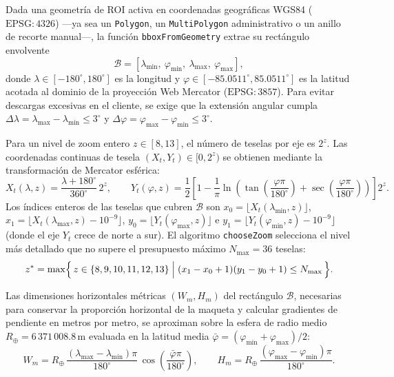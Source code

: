 \documentclass[11pt,a4paper]{article}
\newcommand{\unit}[1]{\mathrm{#1}}
\begin{document}
Dada una geometría de ROI activa en coordenadas geográficas WGS84 ($\mathrm{EPSG}{:}4326$) ---ya sea un
\texttt{Polygon}, un \texttt{MultiPolygon} administrativo o un anillo de recorte manual---, la función
\texttt{bboxFromGeometry} extrae su rectángulo envolvente
\begin{equation}
  \mathcal{B} = [\lambda_{\min},\ \varphi_{\min},\ \lambda_{\max},\ \varphi_{\max}],
  \label{eq:bbox-relieve}
\end{equation}
donde $\lambda\in[-180^\circ,180^\circ]$ es la longitud y $\varphi\in[-85.0511^\circ,85.0511^\circ]$ es la
latitud acotada al dominio de la proyección Web Mercator ($\mathrm{EPSG}{:}3857$). Para evitar descargas
excesivas en el cliente, se exige que la extensión angular cumpla
$\Delta\lambda = \lambda_{\max}-\lambda_{\min}\le 3^\circ$ y
$\Delta\varphi = \varphi_{\max}-\varphi_{\min}\le 3^\circ$.

Para un nivel de zoom entero $z\in[8,13]$, el número de teselas por eje es $2^z$. Las coordenadas continuas
de tesela $(X_t,Y_t)\in[0,2^z)$ se obtienen mediante la transformación de Mercator esférica:
\begin{equation}
  X_t(\lambda,z) = \frac{\lambda + 180^\circ}{360^\circ}\,2^z,
  \qquad
  Y_t(\varphi,z) = \frac{1}{2}\left[
    1 - \frac{1}{\pi}\ln\!\left(\tan\!\left(\frac{\varphi\pi}{180^\circ}\right)
    + \sec\!\left(\frac{\varphi\pi}{180^\circ}\right)\right)
  \right] 2^z .
  \label{eq:mercator-tiles}
\end{equation}
Los índices enteros de las teselas que cubren $\mathcal{B}$ son
$x_0=\lfloor X_t(\lambda_{\min},z)\rfloor$, $x_1=\lfloor X_t(\lambda_{\max},z)-10^{-9}\rfloor$,
$y_0=\lfloor Y_t(\varphi_{\max},z)\rfloor$ e $y_1=\lfloor Y_t(\varphi_{\min},z)-10^{-9}\rfloor$ (donde el eje
$Y_t$ crece de norte a sur). El algoritmo \texttt{chooseZoom} selecciona el nivel más detallado que no supere
el presupuesto máximo $N_{\max}=36$ teselas:
\begin{equation}
  z^\ast = \max\Bigl\{\, z\in\{8,9,10,11,12,13\} \;\Big|\;
  (x_1 - x_0 + 1)(y_1 - y_0 + 1) \le N_{\max} \,\Bigr\}.
  \label{eq:choose-zoom}
\end{equation}

Las dimensiones horizontales métricas $(W_m,H_m)$ del rectángulo $\mathcal{B}$, necesarias para conservar la
proporción horizontal de la maqueta y calcular gradientes de pendiente en metros por metro, se aproximan sobre
la esfera de radio medio $R_\oplus = 6\,371\,008.8\,\unit{m}$ evaluada en la latitud media
$\bar\varphi = (\varphi_{\min}+\varphi_{\max})/2$:
\begin{equation}
  W_m = R_\oplus\,\frac{(\lambda_{\max}-\lambda_{\min})\pi}{180^\circ}\,\cos\!\left(\frac{\bar\varphi\pi}{180^\circ}\right),
  \qquad
  H_m = R_\oplus\,\frac{(\varphi_{\max}-\varphi_{\min})\pi}{180^\circ}.
  \label{eq:bbox-metros}
\end{equation}
\end{document}
